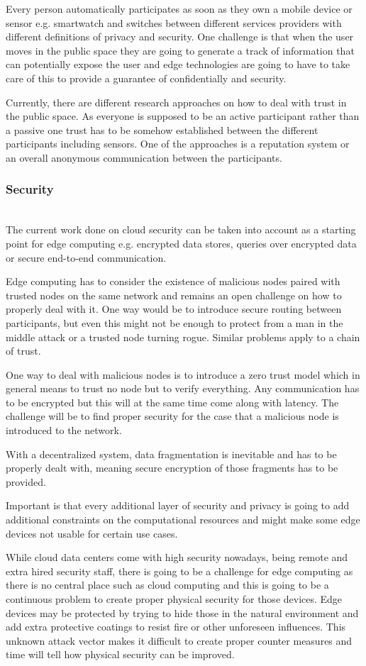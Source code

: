 Every person automatically participates as soon as they own a mobile device or sensor e.g. smartwatch and switches between different services providers with different definitions of privacy and security.
One challenge is that when the user moves in the public space they are going to generate a track of information that can potentially expose the user and edge technologies are going to have to take care of this to provide a guarantee of confidentially and security.

Currently, there are different research approaches on how to deal with trust in the public space. As everyone is supposed to be an active participant rather than a passive one trust has to be somehow established between the different participants including sensors.
One of the approaches is a reputation system or an overall anonymous communication between the participants.

\subsubsection{Security}\hspace*{\fill} \\
The current work done on cloud security can be taken into account as a starting point for edge computing e.g. encrypted data stores, queries over encrypted data or secure end-to-end communication.

Edge computing has to consider the existence of malicious nodes paired with trusted nodes on the same network and remains an open challenge on how to properly deal with it.
One way would be to introduce secure routing between participants, but even this might not be enough to protect from a man in the middle attack or a trusted node turning rogue. Similar problems apply to a chain of trust.

One way to deal with malicious nodes is to introduce a zero trust model which in general means to trust no node but to verify everything. Any communication has to be encrypted but this will at the same time come along with latency.
The challenge will be to find proper security for the case that a malicious node is introduced to the network.

With a decentralized system, data fragmentation is inevitable and has to be properly dealt with, meaning secure encryption of those fragments has to be provided.

Important is that every additional layer of security and privacy is going to add additional constraints on the computational resources and might make some edge devices not usable for certain use cases.

While cloud data centers come with high security nowadays, being remote and extra hired security staff, there is going to be a challenge for edge computing as there is no central place such as cloud computing and this is going to be a continuous problem to create proper physical security for those devices. 
Edge devices may be protected by trying to hide those in the natural environment and add extra protective coatings to resist fire or other unforeseen influences. This unknown attack vector makes it difficult to create proper counter measures and time will tell how physical security can be improved.
